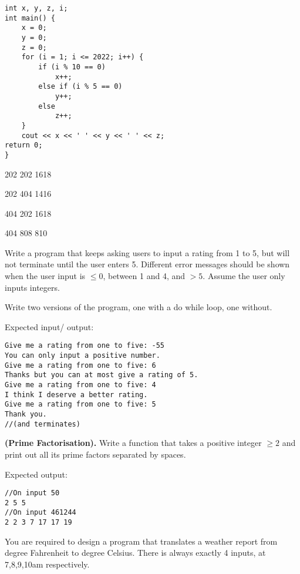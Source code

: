 \begin{questions}
\begin{lstlisting}
int x, y, z, i;
int main() {
    x = 0;
    y = 0;
    z = 0;
    for (i = 1; i <= 2022; i++) {
        if (i % 10 == 0)
            x++;
        else if (i % 5 == 0)
            y++;
        else
            z++;
    }
    cout << x << ' ' << y << ' ' << z;
return 0;
}
\end{lstlisting}

\begin{multiplechoice}
    \item 202 202 1618
    \item 202 404 1416
    \item 404 202 1618
    \item 404 808 810
\end{multiplechoice}

\label{q:hkoi:2022hj:q7}

\miquestion Write a program that keeps asking users to input a rating from 1 to 5, but will not terminate until the user enters 5. Different error messages should be shown when the user input is $\leq 0$, between 1 and 4, and $>5$. Assume the user only inputs integers.

Write two versions of the program, one with a do while loop, one without.

Expected input/ output:
\begin{lstlisting}
Give me a rating from one to five: -55
You can only input a positive number.
Give me a rating from one to five: 6
Thanks but you can at most give a rating of 5.
Give me a rating from one to five: 4
I think I deserve a better rating.
Give me a rating from one to five: 5 
Thank you.
//(and terminates)
\end{lstlisting}

 \textbf{(Prime Factorisation).} Write a function that takes a positive integer $\geq 2$ and print out all its prime factors separated by spaces.

Expected output:
\begin{lstlisting}
//On input 50
2 5 5
//On input 461244
2 2 3 7 17 17 19
\end{lstlisting}

 You are required to design a program that translates a weather report from degree Fahrenheit to degree Celsius. There is always exactly 4 inputs, at 7,8,9,10am respectively.


\end{questions}
